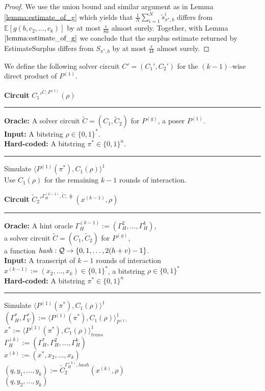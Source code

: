 \begin{proof}
We use the union bound and similar argument as in Lemma \ref{lemma:estimate_of_g}
which yields that $\frac{1}{N} \sum_{i=1}^{N} \widetilde{s}_{\pi^*,b}^i$ differs from
$\mathbb{E}[g(b, c_2, \dots, c_k)]$ by at most $\frac{\epsilon}{8k}$ almost surely. Together, with Lemma $\ref{lemma:estimate_of_g}$ we conclude that the surplus estimate
returned by EstimateSurplus differs from $S_{\pi^*,b}$ by at most $\frac{\epsilon}{4k}$ almost surely.
\end{proof}
%
We define the following solver circuit $C' = (C_1', C_2')$ for the $(k-1)$--wise direct product of $P^{(1)}$.
\begin{codeblock}
  \textbf{Circuit} $C_1'^{\widetilde{C}, P^{(1)}}(\rho)$
  \medskip \hrule
  \textbf{Oracle:} A solver circuit $\widetilde{C} = (C_1, \widetilde{C}_2)$ for $P^{(g)}$, a poser $P^{(1)}$. \\
  \textbf{Input:}  A bitstring $\rho \in \{0,1\}^{*}$. \\
  \textbf{Hard-coded:} A bitstring $\pi^* \in \{0,1\}^{n}$.
  \medskip\hrule
  Simulate $\langle P^{(1)}(\pi^*), C_1(\rho)\rangle^1$ \\
  Use $C_1(\rho)$ for the remaining $k-1$ rounds of interaction.
\end{codeblock}
%
\begin{codeblock}
  \textbf{Circuit} $\widetilde{C}_2'^{\Gamma_H^{(k-1)}, \widetilde{C}, \hash}(x^{(k-1)}, \rho)$
  \medskip \hrule
  \textbf{Oracle:} A hint oracle $\Gamma_H^{(k-1)} := (\Gamma_H^{2}, \dots, \Gamma_H^{k})$,\\
  \IndII a solver circuit $\widetilde{C} = (C_1, \widetilde{C}_2)$ for $P^{(g)}$, \\
  \IndII a function $\operatorname{\mathit{hash}}: \mathcal{Q} \rightarrow \{0,1,\dots, 2(h+v)-1\}$. \\
  \textbf{Input:}  A transcript of $k-1$ rounds of interaction \\
  \IndII $x^{(k-1)} := (x_2, \dotsc, x_{k}) \in \{0,1\}^{*}$, a bitstring $\rho \in \{0,1\}^{*}$\\
  \textbf{Hard-coded:} A bitstring $\pi^* \in \{0,1\}^{n}$
  \medskip\hrule
  Simulate $\langle P^{(1)}(\pi^*), C_1(\rho) \rangle^{1}$ \\
  \IndI $(\Gamma_H^*, \Gamma_V^*) := \langle P^{(1)}(\pi^*), C_1(\rho) \rangle^{1}_{P^{(1)}}$ \\
  \IndI $x^* := \langle P^{(1)}(\pi^*), C_1(\rho) \rangle^{1}_{\mathit{trans}}$ \\
  $\Gamma_H^{(k)} := (\Gamma_H^*, \Gamma_H^{2}, \dots, \Gamma_H^{k})$ \\
  $x^{(k)} := (x^*, x_2, \dots, x_{k})$ \\
  $(q, y_1, \dots, y_k) := \widetilde{C}_2^{\Gamma_H^{(k)}, \mathit{hash}}(x^{(k)}, \rho)$ \\
  \Return $(q, y_2, \dots, y_k)$
\end{codeblock}
